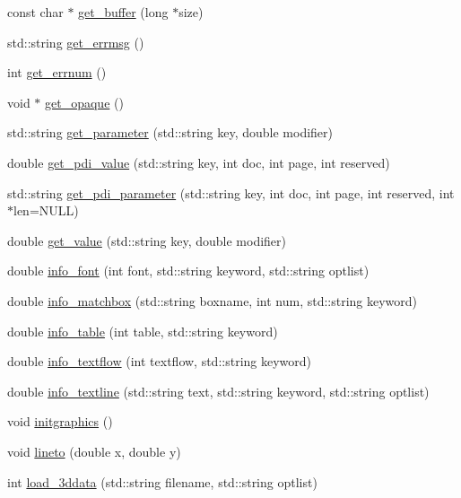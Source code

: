 \begin{DoxyCompactItemize}
const char $\ast$ \hyperlink{classPDFlib_a29b236d867ff4067adf448ce031283eb}{get\+\_\+buffer} (long $\ast$size)
\item 
std\+::string \hyperlink{classPDFlib_aa36d3f54ab4dffc2efaad369bb9257f8}{get\+\_\+errmsg} ()
\item 
int \hyperlink{classPDFlib_aa22b55c8aeb8c8bc42cc286003c29074}{get\+\_\+errnum} ()
\item 
void $\ast$ \hyperlink{classPDFlib_a5b52bcdf06c0ca3c3a26ac8e07665266}{get\+\_\+opaque} ()
\item 
std\+::string \hyperlink{classPDFlib_ad22c14b9973d0d40464ef06fa69d3272}{get\+\_\+parameter} (std\+::string key, double modifier)
\item 
double \hyperlink{classPDFlib_a29235793f31c496e5882e9000b80045e}{get\+\_\+pdi\+\_\+value} (std\+::string key, int doc, int page, int reserved)
\item 
std\+::string \hyperlink{classPDFlib_a7dad0e3b7c73641122eae3258a9fea15}{get\+\_\+pdi\+\_\+parameter} (std\+::string key, int doc, int page, int reserved, int $\ast$len=N\+U\+L\+L)
\item 
double \hyperlink{classPDFlib_a203140e53fe8f2e3660f2173a88c6f5b}{get\+\_\+value} (std\+::string key, double modifier)
\item 
double \hyperlink{classPDFlib_a4691e67c4af969f8a30a27c67d0c7281}{info\+\_\+font} (int font, std\+::string keyword, std\+::string optlist)
\item 
double \hyperlink{classPDFlib_ab87d9425f72659393e4c82a3b70ad29e}{info\+\_\+matchbox} (std\+::string boxname, int num, std\+::string keyword)
\item 
double \hyperlink{classPDFlib_a8b9bee8fcc7b13463c134aadc202f237}{info\+\_\+table} (int table, std\+::string keyword)
\item 
double \hyperlink{classPDFlib_a8c325dd615c090dbc8c3a1a2c6be1c27}{info\+\_\+textflow} (int textflow, std\+::string keyword)
\item 
double \hyperlink{classPDFlib_a5ae97dc66793508bab806074eb3aaf8e}{info\+\_\+textline} (std\+::string text, std\+::string keyword, std\+::string optlist)
\item 
void \hyperlink{classPDFlib_abafce63a807f731025f6425f1cbf0702}{initgraphics} ()
\item 
void \hyperlink{classPDFlib_a2b424210d5622820e27cf6f089003b06}{lineto} (double x, double y)
\item 
int \hyperlink{classPDFlib_aea233d27c34fa1e9d60e9bc27278e27c}{load\+\_\+3ddata} (std\+::string filename, std\+::string optlist)

\end{DoxyCompactItemize}

